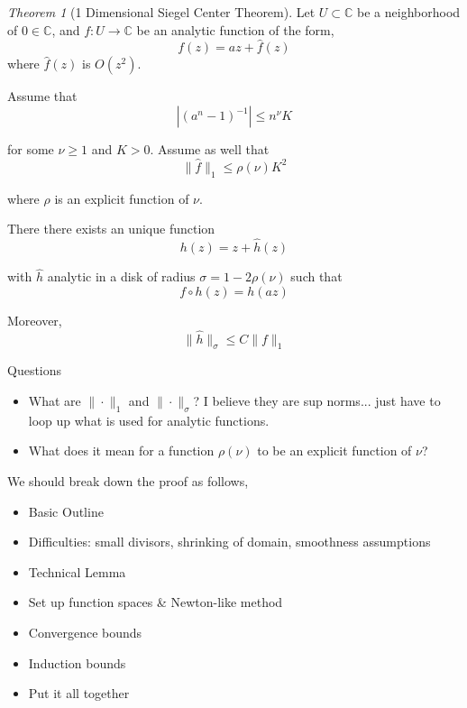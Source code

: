 \documentclass{article}
\newcommand{\C}{\mathbb{C}}
\theoremstyle{plain}
\theoremstyle{remark}
\newtheorem{theorem}{Theorem}
\begin{document}
\begin{theorem}[1 Dimensional Siegel Center Theorem]
Let $U \subset \C$ be a neighborhood of $0 \in \C$, and $f: U \to \C$ be an analytic function of the form,
\begin{equation}
f(z) = az + \hat{f}(z)
\end{equation}
where $\hat{f}(z)$ is $O(z^2)$.

Assume that
\begin{equation}
\left|(a^n - 1)^{-1}\right| \leq n^\nu K
\end{equation}

for some $\nu \geq 1$ and $K > 0$. 
Assume as well that
\begin{equation}
\| \hat{f} \|_1 \leq \rho(\nu) K^2
\end{equation}

where $\rho$ is an explicit function of $\nu$. 

There there exists an unique function
\begin{equation}
h(z) = z + \hat{h}(z)
\end{equation}

with $\hat{h}$ analytic in a disk of radius $\sigma = 1 - 2 \rho(\nu)$ such that 
\begin{equation}
f \circ h(z) = h(az)
\end{equation}

Moreover, 
\begin{equation}
\| \hat{h}\|_\sigma	\leq C \| f \|_1
\end{equation}

\end{theorem}

Questions
\begin{itemize}
\item What are $\| \cdot \|_1$ and $\| \cdot \|_\sigma$? I believe they are sup norms... just have to loop up what is used for analytic functions.

\item What does it mean for a function $\rho(\nu)$ to be an explicit function of $\nu$?
\end{itemize}

\bigskip

We should break down the proof as follows,
\begin{itemize}
\item Basic Outline
\item Difficulties: small divisors, shrinking of domain, smoothness assumptions
\item Technical Lemma
\item Set up function spaces \& Newton-like method
\item Convergence bounds
\item Induction bounds
\item Put it all together
\end{itemize}
\end{document}
